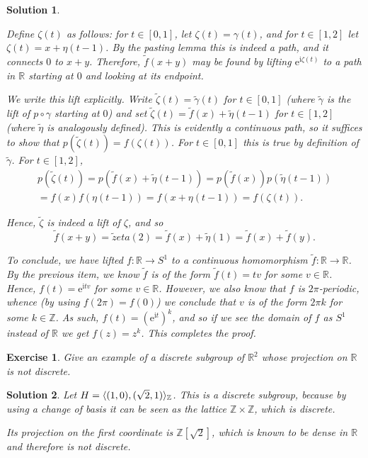 \documentclass{article}
\newtheorem{ex}{Exercise}
\theoremstyle{nonumberplain}
\newtheorem{sol}{Solution}
\newcommand{\R}{\mathbb{R}}
\newcommand{\Z}{\mathbb{Z}}
\newcommand{\I}{\mathrm{i}}
\newcommand{\e}{\mathrm{e}}
\DeclarePairedDelimiter{\braket}{\langle}{\rangle}
\begin{document}
\begin{sol}
\begin{enumerate}
Define $\zeta(t)$ as follows: for $t \in [0,1]$, let $\zeta(t) = \gamma(t)$, and for $t \in [1,2]$ let $\zeta(t) = x + \eta(t-1)$. By the pasting lemma this is indeed a path, and it connects $0$ to $x+y$. Therefore, $\tilde f(x+y)$ may be found by lifting $\e^{\I \zeta(t)}$ to a path in $\R$ starting at $0$ and looking at its endpoint.

We write this lift explicitly. Write $\tilde \zeta(t) = \tilde \gamma(t)$ for $t \in [0,1]$ (where $\tilde \gamma$ is the lift of $p \circ \gamma$ starting at $0$) and set $\tilde \zeta(t) = \tilde f(x) + \tilde \eta(t-1)$ for $t \in [1,2]$ (where $\tilde \eta$ is analogously defined). This is evidently a continuous path, so it suffices to show that $p(\tilde \zeta(t)) = f(\zeta(t))$. For $t \in [0,1]$ this is true by definition of $\tilde \gamma$. For $t \in [1,2]$,
\begin{multline}
p(\tilde \zeta(t)) = p(\tilde f(x) + \tilde \eta(t-1)) = p(\tilde f(x)) p(\tilde \eta(t-1))\\
= f(x)f(\eta(t-1)) = f(x + \eta(t-1)) = f(\zeta(t)).
\end{multline}

Hence, $\tilde \zeta$ is indeed a lift of $\zeta$, and so
\begin{equation}
\tilde f(x+y) = \tilde zeta(2) = \tilde f(x) + \tilde \eta(1) = \tilde f(x) + \tilde f(y).
\end{equation}

To conclude, we have lifted $f \colon \R \to S^1$ to a continuous homomorphism $\tilde f \colon \R \to \R$. By the previous item, we know $\tilde f$ is of the form $\tilde f(t) = tv$ for some $v \in \R$. Hence, $f(t) = \e^{\I t v}$ for some $v \in \R$. However, we also know that $f$ is $2\pi$-periodic, whence (by using $f(2\pi) = f(0)$) we conclude that $v$ is of the form $2\pi k$ for some $k \in \Z$. As such, $f(t) = (\e^{\I t})^k$, and so if we see the domain of $f$ as $S^1$ instead of $\R$ we get $f(z) = z^k$. This completes the proof.
\end{enumerate}
\end{sol}

\begin{ex}
Give an example of a discrete subgroup of $\R^2$ whose projection on $\R$ is not discrete.
\end{ex}

\begin{sol}
Let $H = \braket{(1,0), (\sqrt2, 1)}_\Z$. This is a discrete subgroup, because by using a change of basis it can be seen as the lattice $\Z \times \Z$, which is discrete.

Its projection on the first coordinate is $\Z[\sqrt2]$, which is known to be dense in $\R$ and therefore is not discrete.
\end{sol}
\end{document}
